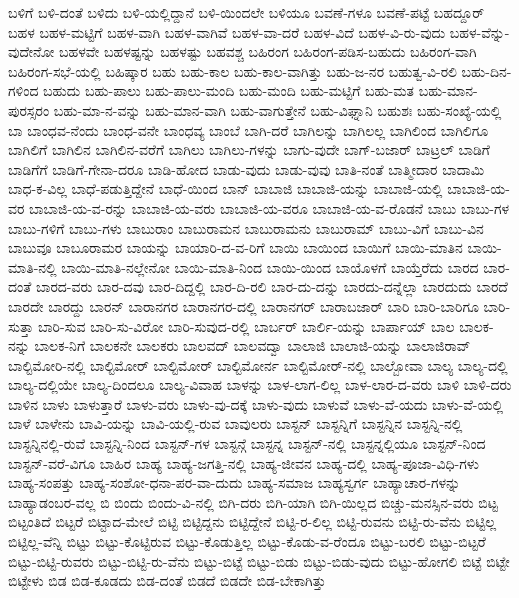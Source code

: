 {ಬಳಿಗೆ
ಬಳಿ-ದಂತೆ
ಬಳಿದು
ಬಳಿ-ಯಲ್ಲಿದ್ದಾನೆ
ಬಳಿ-ಯಿಂದಲೇ
ಬಳಿಯೂ
ಬವಣೆ-ಗಳೂ
ಬವಣೆ-ಪಟ್ಟೆ
ಬಹದ್ದೂರ್
ಬಹಳ
ಬಹಳ-ಮಟ್ಟಿಗೆ
ಬಹಳ-ವಾಗಿ
ಬಹಳ-ವಾಗಿವೆ
ಬಹಳ-ವಾ-ದರೆ
ಬಹಳ-ವಿದೆ
ಬಹಳ-ವಿ-ರು-ವುದು
ಬಹಳ-ವೆನ್ನು-ವುದೇನೋ
ಬಹಳವೇ
ಬಹಳಷ್ಟನ್ನು
ಬಹಳಷ್ಟು
ಬಹವಶ್ಚ
ಬಹಿರಂಗ
ಬಹಿರಂಗ-ಪಡಿಸ-ಬಹುದು
ಬಹಿರಂಗ-ವಾಗಿ
ಬಹಿರಂಗ-ಸಭೆ-ಯಲ್ಲಿ
ಬಹಿಷ್ಕಾರ
ಬಹು
ಬಹು-ಕಾಲ
ಬಹು-ಕಾಲ-ವಾಗಿತ್ತು
ಬಹು-ಜ-ನರ
ಬಹುತ್ವ-ವಿ-ರಲಿ
ಬಹು-ದಿನ-ಗಳಿಂದ
ಬಹುದು
ಬಹು-ಪಾಲು
ಬಹು-ಪಾಲು-ಮಂದಿ
ಬಹು-ಮಂದಿ
ಬಹು-ಮಟ್ಟಿಗೆ
ಬಹು-ಮತ
ಬಹು-ಮಾನ-ಪುರಸ್ಸರಂ
ಬಹು-ಮಾ-ನ-ವನ್ನು
ಬಹು-ಮಾನ-ವಾಗಿ
ಬಹು-ವಾಗುತ್ತೇನೆ
ಬಹು-ವಿಘ್ನಾನಿ
ಬಹುಶಃ
ಬಹು-ಸಂಖ್ಯೆ-ಯಲ್ಲಿ
ಬಾ
ಬಾಂಧವ-ನೆಂದು
ಬಾಂಧ-ವನೇ
ಬಾಂಧವ್ಯ
ಬಾಂಬೆ
ಬಾಗಿ-ದರೆ
ಬಾಗಿಲನ್ನು
ಬಾಗಿಲಲ್ಲ
ಬಾಗಿಲಿಂದ
ಬಾಗಿಲಿಗೂ
ಬಾಗಿಲಿಗೆ
ಬಾಗಿಲಿನ
ಬಾಗಿಲಿನ-ವರೆಗೆ
ಬಾಗಿಲು
ಬಾಗಿಲು-ಗಳನ್ನು
ಬಾಗು-ವುದೇ
ಬಾಗ್-ಬಜಾರ್
ಬಾಟ್ರಲ್
ಬಾಡಿಗೆ
ಬಾಡಿಗೆಗೆ
ಬಾಡಿಗೆ-ಗೇನಾ-ದರೂ
ಬಾಡಿ-ಹೋದ
ಬಾಡು-ವುದು
ಬಾಡು-ವುವು
ಬಾತಿ-ನಂತೆ
ಬಾತ್ಮೀದಾರ
ಬಾದಾಮಿ
ಬಾಧ-ಕ-ವಿಲ್ಲ
ಬಾಧೆ-ಪಡುತ್ತಿದ್ದೇನೆ
ಬಾಧೆ-ಯಿಂದ
ಬಾನ್
ಬಾಬಾಜಿ
ಬಾಬಾಜಿ-ಯನ್ನು
ಬಾಬಾಜಿ-ಯಲ್ಲಿ
ಬಾಬಾಜಿ-ಯ-ವರ
ಬಾಬಾಜಿ-ಯ-ವ-ರನ್ನು
ಬಾಬಾಜಿ-ಯ-ವರು
ಬಾಬಾಜಿ-ಯ-ವರೂ
ಬಾಬಾಜಿ-ಯ-ವ-ರೊಡನೆ
ಬಾಬು
ಬಾಬು-ಗಳ
ಬಾಬು-ಗಳಿಗೆ
ಬಾಬು-ಗಳು
ಬಾಬುರಾಂ
ಬಾಬುರಾಮನ
ಬಾಬುರಾಮನು
ಬಾಬುರಾಮ್
ಬಾಬು-ವಿಗೆ
ಬಾಬು-ವಿನ
ಬಾಬುವೂ
ಬಾಬೂರಾಮರ
ಬಾಯನ್ನು
ಬಾಯಾರಿ-ದ-ವ-ರಿಗೆ
ಬಾಯಿ
ಬಾಯಿಂದ
ಬಾಯಿಗೆ
ಬಾಯಿ-ಮಾತಿನ
ಬಾಯಿ-ಮಾತಿ-ನಲ್ಲಿ
ಬಾಯಿ-ಮಾತಿ-ನಲ್ಲೇನೋ
ಬಾಯಿ-ಮಾತಿ-ನಿಂದ
ಬಾಯಿ-ಯಿಂದ
ಬಾಯೊಳಗೆ
ಬಾಯ್ತೆರೆದು
ಬಾರದ
ಬಾರ-ದಂತೆ
ಬಾರದ-ವರು
ಬಾರ-ದವು
ಬಾರ-ದಿದ್ದಲ್ಲಿ
ಬಾರ-ದಿ-ರಲಿ
ಬಾರ-ದು-ದನ್ನು
ಬಾರದು-ದನ್ನೆಲ್ಲಾ
ಬಾರದುದು
ಬಾರದೆ
ಬಾರದೇ
ಬಾರದ್ದು
ಬಾರನ್
ಬಾರಾನಗರ
ಬಾರಾನಗರ-ದಲ್ಲಿ
ಬಾರಾನಗರ್
ಬಾರಾಬಜಾರ್
ಬಾರಿ
ಬಾರಿ-ಬಾರಿಗೂ
ಬಾರಿ-ಸುತ್ತಾ
ಬಾರಿ-ಸುವ
ಬಾರಿ-ಸು-ವಿರೋ
ಬಾರಿ-ಸುವುದ-ರಲ್ಲಿ
ಬಾರ್ಬರ್
ಬಾರ್ಲಿ-ಯನ್ನು
ಬಾರ್ಪಾಯ್
ಬಾಲ
ಬಾಲಕ-ನನ್ನು
ಬಾಲಕ-ನಿಗೆ
ಬಾಲಕನೇ
ಬಾಲಕರು
ಬಾಲವದ್
ಬಾಲವದ್ವಾ
ಬಾಲಾಜಿ
ಬಾಲಾಜಿ-ಯನ್ನು
ಬಾಲಾಜಿರಾವ್
ಬಾಲ್ಟಿಮೋರಿ-ನಲ್ಲಿ
ಬಾಲ್ಟಿಮೋರ್
ಬಾಲ್ಟಿಮೋರ್
ಬಾಲ್ಟಿಮೋರ್ನ
ಬಾಲ್ಟಿಮೋರ್-ನಲ್ಲಿ
ಬಾಲ್ಬೋವಾ
ಬಾಲ್ಯ
ಬಾಲ್ಯ-ದಲ್ಲಿ
ಬಾಲ್ಯ-ದಲ್ಲಿಯೇ
ಬಾಲ್ಯ-ದಿಂದಲೂ
ಬಾಲ್ಯ-ವಿವಾಹ
ಬಾಳನ್ನು
ಬಾಳ-ಲಾಗ-ಲಿಲ್ಲ
ಬಾಳ-ಲಾರ-ದ-ವರು
ಬಾಳಿ
ಬಾಳಿ-ದರು
ಬಾಳಿನ
ಬಾಳು
ಬಾಳುತ್ತಾರೆ
ಬಾಳು-ವರು
ಬಾಳು-ವು-ದಕ್ಕೆ
ಬಾಳು-ವುದು
ಬಾಳುವೆ
ಬಾಳು-ವೆ-ಯದು
ಬಾಳು-ವೆ-ಯಲ್ಲಿ
ಬಾಳೆ
ಬಾಳೇನು
ಬಾವಿ-ಯನ್ನು
ಬಾವಿ-ಯಲ್ಲಿ-ರುವ
ಬಾವುಲರು
ಬಾಸ್ಟನ್
ಬಾಸ್ಟನ್ನಿಗೆ
ಬಾಸ್ಟನ್ನಿನ
ಬಾಸ್ಟನ್ನಿ-ನಲ್ಲಿ
ಬಾಸ್ಟನ್ನಿನಲ್ಲಿ-ರುವೆ
ಬಾಸ್ಟನ್ನಿ-ನಿಂದ
ಬಾಸ್ಟನ್-ಗಳ
ಬಾಸ್ಟನ್ಗೆ
ಬಾಸ್ಟನ್ನ
ಬಾಸ್ಟನ್-ನಲ್ಲಿ
ಬಾಸ್ಟನ್ನಲ್ಲಿಯೂ
ಬಾಸ್ಟನ್-ನಿಂದ
ಬಾಸ್ಟನ್-ವರೆ-ವಿಗೂ
ಬಾಹಿರ
ಬಾಹ್ಯ
ಬಾಹ್ಯ-ಜಗತ್ತಿ-ನಲ್ಲಿ
ಬಾಹ್ಯ-ಜೀವನ
ಬಾಹ್ಯ-ದಲ್ಲಿ
ಬಾಹ್ಯ-ಪೂಜಾ-ವಿಧಿ-ಗಳು
ಬಾಹ್ಯ-ಸಂಪತ್ತು
ಬಾಹ್ಯ-ಸಂಶೋ-ಧನಾ-ಪರ-ವಾ-ದುದು
ಬಾಹ್ಯ-ಸಮಾಜ
ಬಾಹ್ಯಸ್ವರ್ಗ
ಬಾಹ್ಯಾಚಾರ-ಗಳನ್ನು
ಬಾಹ್ಯಾಡಂಬರ-ವಲ್ಲ
ಬಿ
ಬಿಂದು
ಬಿಂದು-ವಿ-ನಲ್ಲಿ
ಬಿಗಿ-ದರು
ಬಿಗಿ-ಯಾಗಿ
ಬಿಗಿ-ಯಿಲ್ಲದ
ಬಿಚ್ಚು-ಮನಸ್ಸಿನ-ವರು
ಬಿಟ್ಟ
ಬಿಟ್ಟಂತಿದೆ
ಬಿಟ್ಟರೆ
ಬಿಟ್ಟಾದ-ಮೇಲೆ
ಬಿಟ್ಟಿ
ಬಿಟ್ಟಿದ್ದನು
ಬಿಟ್ಟಿದ್ದೇನೆ
ಬಿಟ್ಟಿ-ರ-ಲಿಲ್ಲ
ಬಿಟ್ಟಿ-ರುವನು
ಬಿಟ್ಟಿ-ರು-ವೆನು
ಬಿಟ್ಟಿಲ್ಲ
ಬಿಟ್ಟಿಲ್ಲ-ವೆನ್ನಿ
ಬಿಟ್ಟು
ಬಿಟ್ಟು-ಕೊಟ್ಟಿರುವ
ಬಿಟ್ಟು-ಕೊಡುತ್ತಿಲ್ಲ
ಬಿಟ್ಟು-ಕೊಡು-ವ-ರೆಂದೂ
ಬಿಟ್ಟು-ಬರಲಿ
ಬಿಟ್ಟು-ಬಿಟ್ಟರೆ
ಬಿಟ್ಟು-ಬಿಟ್ಟಿ-ರುವರು
ಬಿಟ್ಟು-ಬಿಟ್ಟಿ-ರು-ವೆನು
ಬಿಟ್ಟು-ಬಿಟ್ಟೆ
ಬಿಟ್ಟು-ಬಿಡು
ಬಿಟ್ಟು-ಬಿಡು-ವುದು
ಬಿಟ್ಟು-ಹೋಗಲಿ
ಬಿಟ್ಟೆ
ಬಿಟ್ಟೇ
ಬಿಟ್ಟೇಳು
ಬಿಡ
ಬಿಡ-ಕೂಡದು
ಬಿಡ-ದಂತೆ
ಬಿಡದೆ
ಬಿಡದೇ
ಬಿಡ-ಬೇಕಾಗಿತ್ತು
}
